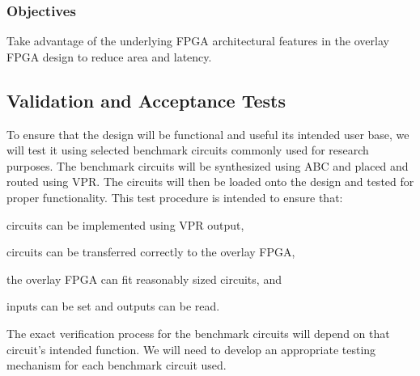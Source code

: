 \subsubsection{Objectives}

\begin{itemlist}
	\item Take advantage of the underlying FPGA architectural features in the overlay FPGA design to reduce area and latency.
\end{itemlist}


\subsection{Validation and Acceptance Tests}


To ensure that the design will be functional and useful its intended user base, we will test it using selected benchmark circuits commonly used for research purposes.
The benchmark circuits will be synthesized using ABC and placed and routed using VPR.
The circuits will then be loaded onto the design and tested for proper functionality.
This test procedure is intended to ensure that:
\begin{itemlist}
	\item circuits can be implemented using VPR output,
	\item circuits can be transferred correctly to the overlay FPGA,
	\item the overlay FPGA can fit reasonably sized circuits, and
	\item inputs can be set and outputs can be read.
\end{itemlist}
The exact verification process for the benchmark circuits will depend on that circuit's intended function.
We will need to develop an appropriate testing mechanism for each benchmark circuit used.


